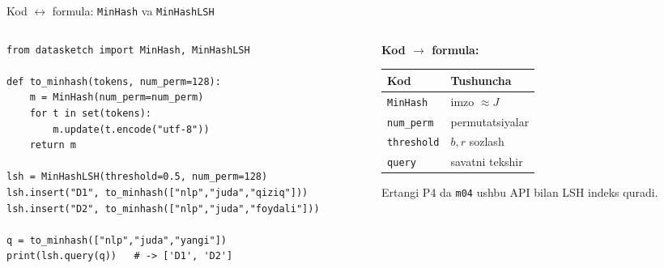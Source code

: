 \documentclass[aspectratio=169,11pt]{beamer}
\begin{document}
\begin{frame}[fragile]{Kod $\leftrightarrow$ formula: \texttt{MinHash} va \texttt{MinHashLSH}}
  \begin{columns}[T]
    \begin{column}{0.56\textwidth}
\begin{lstlisting}
from datasketch import MinHash, MinHashLSH

def to_minhash(tokens, num_perm=128):
    m = MinHash(num_perm=num_perm)
    for t in set(tokens):
        m.update(t.encode("utf-8"))
    return m

lsh = MinHashLSH(threshold=0.5, num_perm=128)
lsh.insert("D1", to_minhash(["nlp","juda","qiziq"]))
lsh.insert("D2", to_minhash(["nlp","juda","foydali"]))

q = to_minhash(["nlp","juda","yangi"])
print(lsh.query(q))   # -> ['D1', 'D2']
\end{lstlisting}
    \end{column}
    \begin{column}{0.40\textwidth}
      \textbf{Kod $\to$ formula:}\\[3pt]
      \footnotesize
      \begin{tabular}{p{1.9cm}p{2.1cm}}
        \toprule
        Kod & Tushuncha \\
        \midrule
        \texttt{MinHash} & imzo $\approx J$ \\
        \texttt{num\_perm} & permutatsiyalar \\
        \texttt{threshold} & $b,r$ sozlash \\
        \texttt{query} & savatni tekshir \\
        \bottomrule
      \end{tabular}
      \vspace{4pt}
      \begin{tcolorbox}[okbox,top=2pt,bottom=2pt]
        \footnotesize
        Ertangi P4 da \texttt{m04} ushbu API bilan LSH indeks quradi.
      \end{tcolorbox}
    \end{column}
  \end{columns}
\end{frame}
\end{document}
